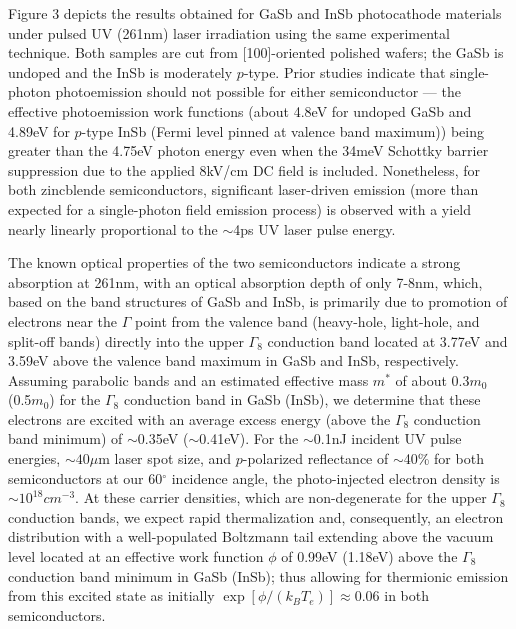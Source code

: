 Figure 3 depicts the results obtained for GaSb and InSb photocathode materials under pulsed UV (261nm) laser irradiation using the same experimental technique.
Both samples are cut from [100]-oriented polished wafers; the GaSb is undoped and the InSb is moderately $p$-type.
Prior studies\cite{gobeli_photoelectric_1965} indicate that single-photon photoemission should not possible for either semiconductor --- the effective photoemission work functions (about 4.8eV for undoped GaSb and 4.89eV for $p$-type InSb (Fermi level pinned at valence band maximum)) being greater than the 4.75eV photon energy even when the 34meV Schottky barrier suppression due to the applied 8kV/cm DC field is included\cite{dowell_quantum_2009}.
Nonetheless, for both zincblende semiconductors, significant laser-driven emission (more than expected for a single-photon field emission process) is observed with a yield nearly linearly proportional to the $\sim$4ps UV laser pulse energy.

The known optical properties of the two semiconductors\cite{aspnes_dielectric_1983} indicate a strong absorption at 261nm, with an optical absorption depth of only 7-8nm, which, based on the band structures of GaSb\cite{chelikowsky_nonlocal_1976} and InSb\cite{chelikowsky_erratum_1984}, is primarily due to promotion of electrons near the $\Gamma$ point from the valence band (heavy-hole, light-hole, and split-off bands) directly into the upper $\Gamma_8$ conduction band located at 3.77eV and 3.59eV above the valence band maximum in GaSb and InSb, respectively.
Assuming parabolic bands and an estimated effective mass $m^*$ of about 0.3$m_0$ (0.5$m_0$) for the $\Gamma_8$ conduction band in GaSb (InSb), we determine that these electrons are excited with an average excess energy (above the $\Gamma_8$ conduction band minimum) of $\sim$0.35eV ($\sim$0.41eV).
For the $\sim$0.1nJ incident UV pulse energies, $\sim40\mu$m laser spot size, and $p$-polarized reflectance of $\sim$40\% for both semiconductors at our 60$^{\circ}$ incidence angle, the photo-injected electron density is $\sim10^{18}cm^{-3}$.
At these carrier densities, which are non-degenerate for the upper $\Gamma_8$ conduction bands, we expect rapid thermalization\cite{portella_k-space_1992} and, consequently, an electron distribution with a well-populated Boltzmann tail extending above the vacuum level located at an effective work function $\phi$ of 0.99eV (1.18eV) above the $\Gamma_8$ conduction band minimum in GaSb (InSb); thus allowing for thermionic emission from this excited state as initially $\exp[\phi/(k_B T_e)] \approx 0.06$ in both semiconductors.  

